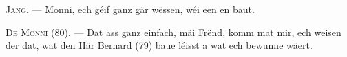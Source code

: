 %
%
%
%
%

\VUsaut{6.0mm}
\VUsaut{1.4mm}
\VUsaut{2.2mm}

\VUsaut{3.0mm}

\textsc{Jang}. --- Monni, ech géif ganz gär wëssen, wéi een en  baut.

\textsc{De Monni} (80). --- Dat ass ganz einfach, mäi Frënd, komm mat mir, ech weisen
der dat, wat den Här Bernard (79) baue léisst a wat ech bewunne wäert.


